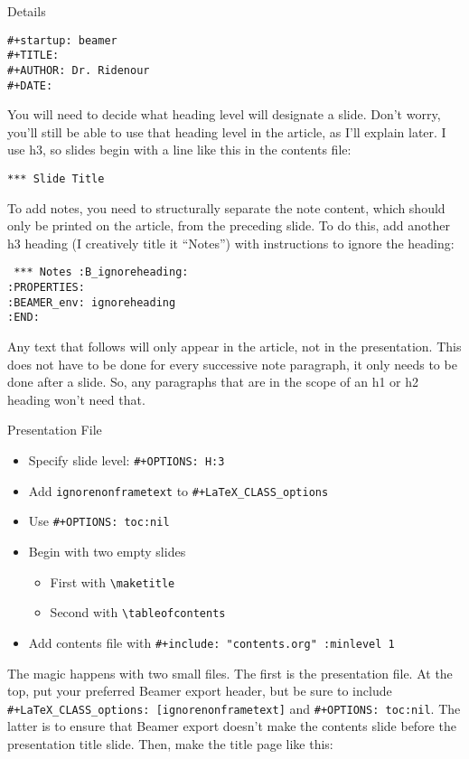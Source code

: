 \documentclass[11pt]{article}
\begin{document}
\begin{frame}[label={sec:org67b5962},fragile]{Details}
\begin{verbatim}
#+startup: beamer
#+TITLE:
#+AUTHOR: Dr. Ridenour
#+DATE:
\end{verbatim}

You will need to decide what heading level will designate a slide. Don't worry, you'll still be able to use that heading level in the article, as I'll explain later. I use h3, so slides begin with a line like this in the contents file:



\texttt{*** Slide Title}

To add notes, you need to structurally separate the note content, which should only be printed on the article, from the preceding slide. To do this, add another h3 heading (I creatively title it ``Notes'') with instructions to ignore the heading:

\begin{verbatim}
 *** Notes :B_ignoreheading:
:PROPERTIES:
:BEAMER_env: ignoreheading
:END:
\end{verbatim}

Any text that follows will only appear in the article, not in the presentation. This does not have to be done for every successive note paragraph, it only needs to be done after a slide. So, any paragraphs that are in the scope of an h1 or h2 heading won't need that.

\begin{block}{Presentation File}
\begin{itemize}
\item Specify slide level: \texttt{\#+OPTIONS: H:3}
\item Add \texttt{ignorenonframetext} to \texttt{\#+LaTeX\_CLASS\_options}
\item Use \texttt{\#+OPTIONS: toc:nil}
\item Begin with two empty slides
\begin{itemize}
\item First with \texttt{\textbackslash{}maketitle}
\item Second with \texttt{\textbackslash{}tableofcontents}
\end{itemize}
\item Add contents file with \texttt{\#+include: "contents.org" :minlevel 1}
\end{itemize}
\end{block}

The magic happens with two small files. The first is the presentation file. At the top, put your preferred Beamer export header, but be sure to include \texttt{\#+LaTeX\_CLASS\_options: [ignorenonframetext]} and \texttt{\#+OPTIONS: toc:nil}. The latter is to ensure that Beamer export doesn't make the contents slide before the presentation title slide.  Then, make the title page like this:


\end{frame}
\end{document}
